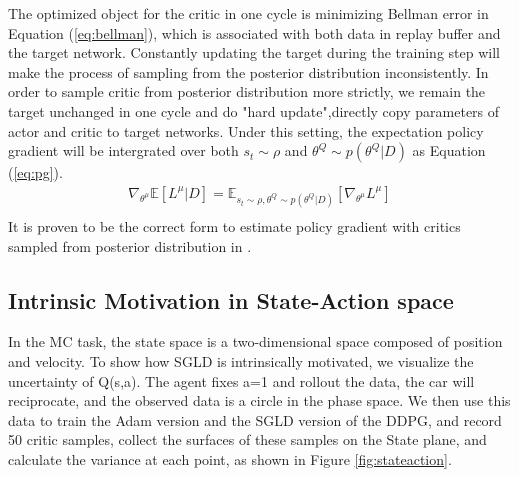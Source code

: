 The optimized object for the critic in one cycle is minimizing Bellman error in Equation (\ref{eq:bellman}), which is associated with both data in replay buffer and the target network. Constantly updating the target during the training step will make the process of sampling from the posterior distribution inconsistently. In order to sample critic from posterior distribution more strictly, we remain the target unchanged in one cycle and do "hard update",directly copy parameters of actor and critic to target networks. Under this setting, the expectation policy gradient will be intergrated over both $s_t\sim\rho$ and $\theta^Q\sim p(\theta^Q|D)$ as Equation (\ref{eq:pg}). 
\begin{equation}
   \label{eq:pg} 
   \begin{aligned}
   \nabla_{\theta^\mu}\mathbb{E}[L^\mu|D] = \mathbb{E}_{s_t\sim\rho,\theta^Q\sim p(\theta^Q|D)}[\nabla_{\theta^\mu}L^\mu]\\
   \end{aligned}
\end{equation}
It is proven to be the correct form to estimate policy gradient with critics sampled from posterior distribution in \cite{dropoutInference}.

\subsection{Intrinsic Motivation in State-Action space}
In the MC task, the state space is a two-dimensional space composed of position and velocity. To show how SGLD is intrinsically motivated, we visualize the uncertainty of Q(s,a). The agent fixes a=1 and rollout the data, the car will reciprocate, and the observed data is a circle in the phase space. We then use this data to train the Adam version and the SGLD version of the DDPG, and record 50 critic samples, collect the surfaces of these samples on the State plane, and calculate the variance at each point, as shown in Figure \ref{fig:stateaction}.

